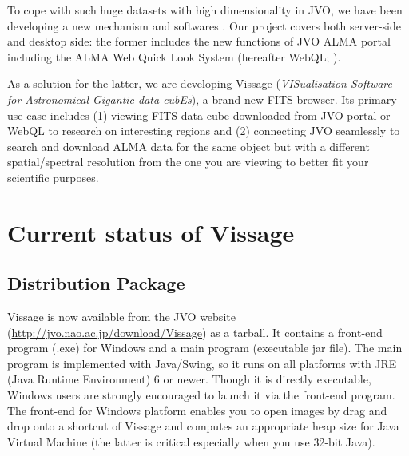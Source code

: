 To cope with such huge datasets with high dimensionality in JVO, we have been 
developing a new mechanism and softwares \citep{O10_adassxxii, D5_adassxxii}. 
Our project covers both server-side and desktop side: the former includes the 
new functions of JVO ALMA portal including the ALMA Web Quick Look System 
(hereafter WebQL; \citet{O10_adassxxii}). 

As a solution for the latter, we are developing Vissage ({\it VISualisation 
Software for Astronomical Gigantic data cubEs}), a brand-new FITS browser. 
Its primary use case includes (1) viewing FITS data cube downloaded from JVO 
portal or WebQL to research on interesting regions and (2) connecting JVO 
seamlessly to search and download ALMA data for the same object but with a 
different spatial/spectral resolution from the one you are viewing to better 
fit your scientific purposes. 

\section{Current status of Vissage}
\subsection{Distribution Package}
Vissage is now available from the JVO website 
(\url{http://jvo.nao.ac.jp/download/Vissage}) as a tarball. It contains a 
front-end program (.exe) for Windows and a main program (executable jar file). 
The main program is implemented with Java/Swing, so it runs on all platforms 
with JRE (Java Runtime Environment) 6 or newer. Though it is directly 
executable, Windows users are strongly encouraged to launch it via the 
front-end program. The front-end for Windows platform enables you to open images 
by drag and drop onto a shortcut of Vissage and computes an appropriate heap 
size for Java Virtual Machine (the latter is critical especially when you use 
32-bit Java). 

